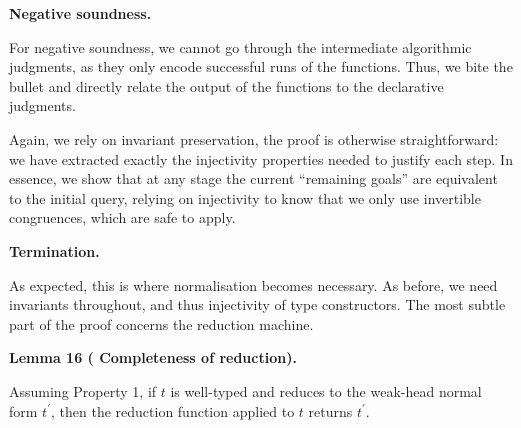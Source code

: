 \documentclass[10pt,a4paper]{amsart}
\begin{document}
 
\par\medskip\noindent\textbf{Negative soundness.}\par
 
 
For negative soundness, we cannot go through the intermediate algorithmic judgments, as they only encode successful runs of the functions. Thus, we bite the bullet and directly relate the output of the functions to the declarative judgments.\par
 

 
Again, we rely on invariant preservation, the proof is otherwise straightforward: we have extracted exactly the injectivity properties needed to justify each step. In essence, we show that at any stage the current “remaining goals” are equivalent to the initial query, relying on injectivity to know that we only use invertible congruences, which are safe to apply.\par
 
 
 
 
\par\medskip\noindent\textbf{Termination.}\par
 
 
As expected, this is where normalisation becomes necessary. As before, we need invariants throughout, and thus injectivity of type constructors. The most subtle part of the proof concerns the reduction machine.\par
 
 
 
\par\medskip\noindent\textbf{Lemma 16 (  Completeness of reduction).}\par
 
 
Assuming Property 1, if $t$ is well-typed and reduces to the weak-head normal form $t^{\prime}$, then the reduction function applied to $t$ returns $t^{\prime}$.\par
 
\end{document}
